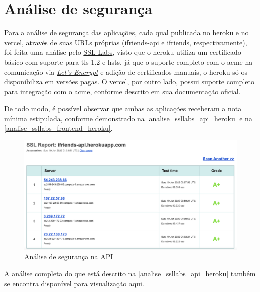 \section{Análise de segurança}
Para a análise de segurança das aplicações, cada qual publicada no \gls{heroku} e no \gls{vercel}, através de suas URLs próprias (ifriends-api e ifriends, respectivamente), foi feita uma análise pelo \href{https://www.ssllabs.com/}{SSL Labs}, visto que o \gls{heroku} utiliza um certificado básico com suporte para \acs{tls} 1.2 e \acs{hsts}, já que o suporte completo com o \acs{acme} na comunicação via \href{https://letsencrypt.org/getting-started/}{\textsl{Let's Encrypt}} e adição de certificados manuais, o \gls{heroku} só os disponibiliza \href{https://devcenter.heroku.com/articles/ssl}{ em versões pagas}. O \acs{vercel}, por outro lado, possui suporte completo para integração com o \acs{acme}, conforme descrito em sua \href{https://vercel.com/blog/automatic-ssl-with-vercel-lets-encrypt}{documentação oficial}.

De todo modo, é possível observar que ambas as aplicações receberam a nota mínima estipulada, conforme demonstrado na \autoref{analise_ssllabs_api_heroku} e na \autoref{analise_ssllabs_frontend_heroku}.

\begin{figure}[htb]
\centering
\caption{\label{analise_ssllabs_api_heroku} Análise de segurança na API}
\includegraphics[width=1\textwidth]{anexos/Imagens_Seguranca/analise_ssllabs_api_heroku.png}
\end{figure}
\FloatBarrier
A análise completa do que está descrito na \autoref{analise_ssllabs_api_heroku} também se encontra disponível para visualização \href{https://www.ssllabs.com/ssltest/analyze.html?d=ifriends-api.herokuapp.com}{aqui}.

